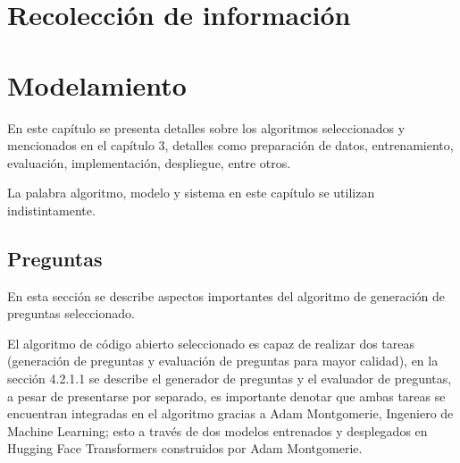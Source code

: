 \documentclass[spanish, a4paper, 12pt, twoside, openany]{book}
\numberwithin{equation}{section} %
\begin{document}






\chapter{Recolección de información}


\chapter{Modelamiento}
\begin{justify}
En este capítulo se presenta detalles sobre los algoritmos seleccionados y mencionados en el capítulo 3, detalles como preparación de datos, entrenamiento, evaluación, implementación, despliegue, entre otros.

La palabra algoritmo, modelo y sistema en este capítulo se utilizan indistintamente.
\end{justify}



\section{Preguntas}
\begin{justify}
En esta sección se describe aspectos importantes del algoritmo de generación de preguntas seleccionado. 

El algoritmo de código abierto seleccionado \cite{45} es capaz de realizar dos tareas (generación de preguntas y evaluación de preguntas para mayor calidad), en la sección 4.2.1.1 se describe el generador de preguntas y el evaluador de preguntas, a pesar de presentarse por separado, es importante denotar que ambas tareas se encuentran integradas en el algoritmo gracias a Adam Montgomerie, Ingeniero de Machine Learning; esto a través de dos modelos entrenados y desplegados en Hugging Face Transformers construidos por Adam Montgomerie.
\end{justify}
\end{document}
